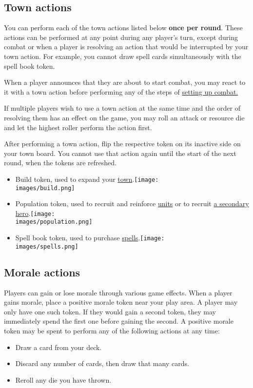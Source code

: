 \documentclass[12pt]{article}
\def\assets{assets}
\def\images{\assets/images}
\def\svgs{\assets/svgs}
\begin{document}
\subsection*{Town actions}
You can perform each of the town actions listed below \textbf{once per round}. These actions can be performed at any point during any player’s turn, except during combat or when a player is resolving an action that would be interrupted by your town action. For example, you cannot draw spell cards simultaneously with the spell book token.\par
When a player announces that they are about to start combat, you may react to it with a town action before performing any of the steps of
 \hyperlink{Combatsetup}{setting up combat.}\par
If multiple players wish to use a town action at the same time and the order of resolving them has an effect on the game, you may roll an attack or resource die and let the highest roller perform the action first.\par
After performing a town action, flip the respective token on its inactive side on your town board. You cannot use that action again until the start of the next round, when the tokens are refreshed.
\begin{itemize}
\item Build token, used to expand your \hyperlink{Town}{town}.\texttt{[image: \\images/build.png]}
\item Population token, used to recruit and reinforce \hyperlink{Units}{units} or to recruit \hyperlink{Secondary}{a secondary hero}.\texttt{[image: \\images/population.png]}
\item Spell book token, used to purchase \hyperlink{spells}{spells}.\texttt{[image: \\images/spells.png]}
\end{itemize}

\subsection*{Morale actions}
Players can gain or lose morale through various game effects. When a player gains morale, place a positive morale token  near your play area. A player may only have one such token. If they would gain a second token, they may immediately spend the first one before gaining the second. A positive morale token may be spent to perform any of the following actions at any time:
\begin{itemize}
\item Draw a card from your deck.
\item Discard any number of cards, then draw that many cards.
\item Reroll any die you have thrown.
\end{itemize}
\end{document}
